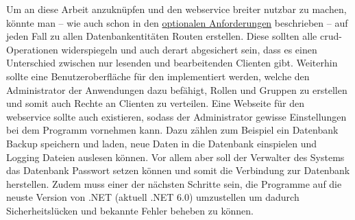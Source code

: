 	Um an diese Arbeit anzuknüpfen und den \gls{webservice} breiter nutzbar zu machen,
	könnte man
	-- wie auch schon in den \hyperref[sec:optionale-anforderungen]{optionalen Anforderungen} beschrieben --
	auf jeden Fall zu allen Datenbankentitäten Routen erstellen.
	Diese sollten alle \gls{crud}-Operationen widerspiegeln
	und auch derart abgesichert sein,
	dass es einen Unterschied zwischen nur lesenden und bearbeitenden Clienten gibt.
	Weiterhin sollte eine Benutzeroberfläche für den  implementiert werden,
	welche den Administrator der Anwendungen dazu befähigt,
	Rollen und Gruppen zu erstellen
	und somit auch Rechte an Clienten zu verteilen.
	Eine Webseite für den \gls{webservice} sollte auch existieren,
	sodass der Administrator gewisse Einstellungen bei dem Programm vornehmen kann.
	Dazu zählen zum Beispiel ein Datenbank Backup speichern und laden,
	neue Daten in die Datenbank einspielen
	und Logging Dateien auslesen können.
	Vor allem aber soll der Verwalter des Systems das Datenbank Passwort setzen können
	und somit die Verbindung zur Datenbank herstellen.
	Zudem muss einer der nächsten Schritte sein,
	die Programme auf die neuste Version von .NET (aktuell .NET 6.0) umzustellen
	um dadurch Sicherheitslücken und bekannte Fehler beheben zu können.